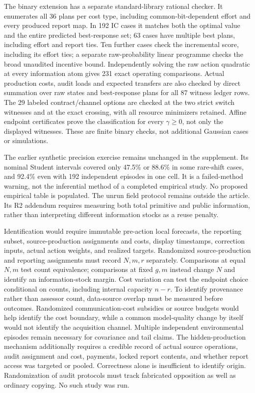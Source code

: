 \documentclass[
  11pt,
]{article}
\begin{document}
The binary extension has a separate standard-library rational checker.
It enumerates all 36 plans per cost type, including common-bit-dependent
effort and every produced report map. In 192 IC cases it matches both
the optimal value and the entire predicted best-response set; 63 cases
have multiple best plans, including effort and report ties. Ten further
cases check the incremental score, including its effort ties; a separate
raw-probability linear programme checks the broad unaudited incentive
bound. Independently solving the raw action quadratic at every
information atom gives 231 exact operating comparisons. Actual
production costs, audit loads and expected transfers are also checked by
direct summation over raw states and best-response plans for all 87
witness ledger rows. The 29 labeled contract/channel options are checked
at the two strict switch witnesses and at the exact crossing, with all
resource minimizers retained. Affine endpoint certificates prove the
classification for every \(\gamma\geq0\), not only the displayed
witnesses. These are finite binary checks, not additional Gaussian cases
or simulations.

The earlier synthetic precision exercise remains unchanged in the
supplement. Its nominal Student intervals covered only 47.5\% or 88.6\%
in some rare-shift cases, and 92.4\% even with 192 independent episodes
in one cell. It is a failed-method warning, not the inferential method
of a completed empirical study. No proposed empirical table is
populated. The unrun field protocol remains outside the article. Its R2
addendum requires measuring both total primitive and public information,
rather than interpreting different information stocks as a reuse
penalty.

Identification would require immutable pre-action local forecasts, the
reporting subset, source-production assignments and costs, display
timestamps, correction inputs, actual action weights, and realized
targets. Randomized source-production and reporting assignments must
record \(N,m,r\) separately. Comparisons at equal \(N,m\) test count
equivalence; comparisons at fixed \(g,m\) instead change \(N\) and
identify an information-stock margin. Cost variation can test the
endpoint choice conditional on counts, including internal capacity
\(n-r\). To identify provenance rather than assessor count, data-source
overlap must be measured before outcomes. Randomized communication-cost
subsidies or source budgets would help identify the cost boundary, while
a common model-quality change by itself would not identify the
acquisition channel. Multiple independent environmental episodes remain
necessary for covariance and tail claims. The hidden-production
mechanism additionally requires a credible record of actual source
operations, audit assignment and cost, payments, locked report contents,
and whether report access was targeted or pooled. Correctness alone is
insufficient to identify origin. Randomization of audit protocols must
track fabricated opposition as well as ordinary copying. No such study
was run.
\end{document}
